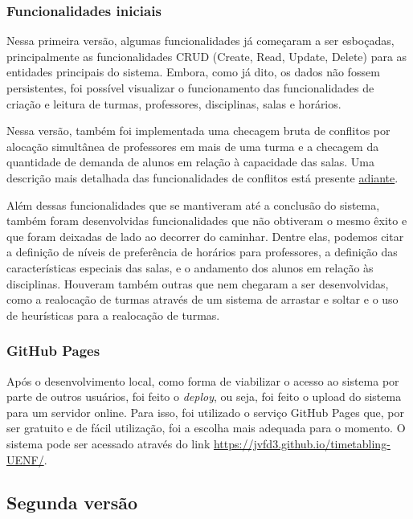 \subsubsection{Funcionalidades iniciais}

Nessa primeira versão, algumas funcionalidades já começaram a ser esboçadas, principalmente as funcionalidades CRUD (Create, Read, Update, Delete) para as entidades principais do sistema. Embora, como já dito, os dados não fossem persistentes, foi possível visualizar o funcionamento das funcionalidades de criação e leitura de turmas, professores, disciplinas, salas e horários.

Nessa versão, também foi implementada uma checagem bruta de conflitos por alocação simultânea de professores em mais de uma turma e a checagem da quantidade de demanda de alunos em relação à capacidade das salas. Uma descrição mais detalhada das funcionalidades de conflitos está presente \hyperref[Conflitos]{adiante}.

Além dessas funcionalidades que se mantiveram até a conclusão do sistema, também foram desenvolvidas funcionalidades que não obtiveram o mesmo êxito e que foram deixadas de lado ao decorrer do caminhar. Dentre elas, podemos citar a definição de níveis de preferência de horários para professores, a definição das características especiais das salas, e o andamento dos alunos em relação às disciplinas. Houveram também outras que nem chegaram a ser desenvolvidas, como a realocação de turmas através de um sistema de arrastar e soltar e o uso de heurísticas para a realocação de turmas.

\subsubsection{GitHub Pages}

Após o desenvolvimento local, como forma de viabilizar o acesso ao sistema por parte de outros usuários, foi feito o \textit{deploy}, ou seja, foi feito o upload do sistema para um servidor online. Para isso, foi utilizado o serviço GitHub Pages que, por ser gratuito e de fácil utilização, foi a escolha mais adequada para o momento. O sistema pode ser acessado através do link \url{https://jvfd3.github.io/timetabling-UENF/}.

\subsection{Segunda versão} %

